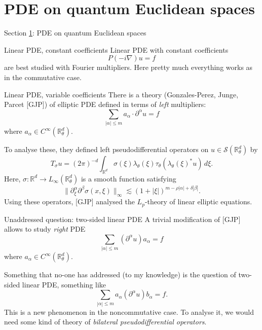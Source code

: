 \documentclass{beamer}
\numberwithin{equation}{section}
\theoremstyle{plain}
\theoremstyle{plain}
\theoremstyle{definition}
\theoremstyle{plain}
\theoremstyle{plain}
\theoremstyle{definition}
\newcommand{\Rl}{\mathbb{R}}
\newcommand{\Sc}{\mathcal{S}}
\begin{document}
\section{PDE on quantum Euclidean spaces}\label{pde_section}

\begin{frame}
    \Huge{Section \ref{pde_section}: PDE on quantum Euclidean spaces}
\end{frame}

\begin{frame}{Linear PDE, constant coefficients}
    Linear PDE with constant coefficients
    \[
        P(-i\nabla)u = f
    \]
    are best studied with Fourier multipliers. Here pretty much everything works as in the commutative case.
\end{frame}

\begin{frame}{Linear PDE, variable coefficients}
    There is a theory (Gonzales-Perez, Junge, Parcet [GJP]) of elliptic PDE defined in terms of \emph{left} multipliers:
    \[
        \sum_{|\alpha|\leq m} a_{\alpha} \cdot \partial^{\alpha}u = f
    \]
    where $a_{\alpha}\in C^\infty(\Rl^d_\theta).$

    \pause To analyse these, they defined left pseudodifferential operators on $u\in \Sc(\Rl^d_\theta)$ by
    \[
        T_{\sigma}u = (2\pi)^{-d}\int_{\Rl^d} \sigma(\xi)\lambda_\theta(\xi)\tau_\theta(\lambda_\theta(\xi)^*u)\,d\xi.
    \]
    Here, $\sigma:\Rl^d\to L_{\infty}(\Rl^d_\theta)$ is a smooth function satisfying
    \[
        \|\partial_{\xi}^{\alpha}\partial^\beta \sigma(x,\xi)\|_{\infty} \lesssim (1+|\xi|)^{m-\rho|\alpha|+\delta |\beta|}.
    \]
    \pause
    Using these operators, [GJP] analysed the $L_p$-theory of linear elliptic equations.
\end{frame}

\begin{frame}{Unaddressed question: two-sided linear PDE}
    A trivial modification of [GJP] allows to study \emph{right} PDE
    \[
        \sum_{|\alpha|\leq m} (\partial^{\alpha}u)a_{\alpha} = f
    \]
    where $a_{\alpha}\in C^\infty(\Rl^d_\theta).$

    Something that no-one has addressed (to my knowledge) is the question of two-sided linear PDE, something like
    \[
        \sum_{|\alpha|\leq m} a_{\alpha}(\partial^{\alpha}u)b_{\alpha} = f.
    \]
    This is a new phenomenon in the noncommutative case.\pause
    To analyse it, we would need some kind of theory of \emph{bilateral pseudodifferential operators}.
\end{frame}
\end{document}
